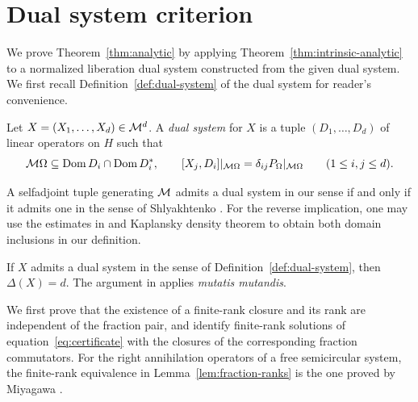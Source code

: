 \section{Dual system criterion}
\label{sec:dual-system-criterion}

We prove Theorem~\ref{thm:analytic} by applying Theorem~\ref{thm:intrinsic-analytic} to a normalized liberation dual system constructed from the given dual system.
We first recall Definition~\ref{def:dual-system} of the dual system for reader's convenience.

\begin{definition*}
Let $X=(X_1,\ldots,X_d)\in\mathcal M^d$.
A \emph{dual system} for $X$ is a tuple $(D_1,\ldots,D_d)$ of linear operators on $H$ such that
\[
 \mathcal M\Omega\subseteq\operatorname{Dom} D_i\cap\operatorname{Dom} D_i^*,\qquad
 [X_j,D_i]|_{\mathcal M\Omega}=\delta_{ij}P_\Omega|_{\mathcal M\Omega}
 \qquad(1\leq i,j\leq d).
\]
\end{definition*}

A selfadjoint tuple generating $\mathcal M$ admits a dual system in our sense if and only if it admits one in the sense of Shlyakhtenko \cite[Theorem~1]{Shl06}.
For the reverse implication, one may use the estimates in \cite[Lemma~3.4]{MSW17} and Kaplansky density theorem to obtain both domain inclusions in our definition.

\begin{remark}\label{rem:dual-maximality}
If $X$ admits a dual system in the sense of Definition~\ref{def:dual-system}, then $\Delta(X)=d$.
The argument in \cite[proof of Proposition~6.2]{MSY23} applies \emph{mutatis mutandis}.
\end{remark}

We first prove that the existence of a finite-rank closure and its rank are independent of the fraction pair, and identify finite-rank solutions of equation~\eqref{eq:certificate} with the closures of the corresponding fraction commutators.
For the right annihilation operators of a free semicircular system, the finite-rank equivalence in Lemma~\ref{lem:fraction-ranks} is the one proved by Miyagawa \cite[Lemma~4.6]{Miy22}.

